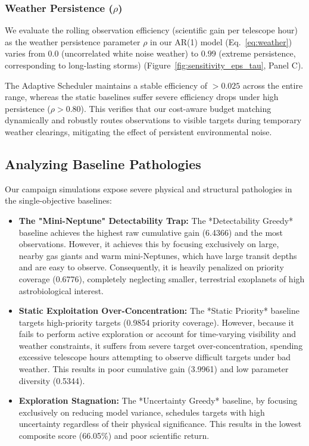 \documentclass[11pt,a4paper]{article}
\begin{document}
\subsubsection{Weather Persistence ($\rho$)}
We evaluate the rolling observation efficiency (scientific gain per telescope hour) as the weather persistence parameter $\rho$ in our AR(1) model (Eq.~\ref{eq:weather}) varies from $0.0$ (uncorrelated white noise weather) to $0.99$ (extreme persistence, corresponding to long-lasting storms) (Figure~\ref{fig:sensitivity_eps_tau}, Panel C). 

The Adaptive Scheduler maintains a stable efficiency of $> 0.025$ across the entire range, whereas the static baselines suffer severe efficiency drops under high persistence ($\rho > 0.80$). This verifies that our cost-aware budget matching dynamically and robustly routes observations to visible targets during temporary weather clearings, mitigating the effect of persistent environmental noise.

\subsection{Analyzing Baseline Pathologies}

Our campaign simulations expose severe physical and structural pathologies in the single-objective baselines:
\begin{itemize}
    \item \textbf{The "Mini-Neptune" Detectability Trap:} The *Detectability Greedy* baseline achieves the highest raw cumulative gain (6.4366) and the most observations. However, it achieves this by focusing exclusively on large, nearby gas giants and warm mini-Neptunes, which have large transit depths and are easy to observe. Consequently, it is heavily penalized on priority coverage (0.6776), completely neglecting smaller, terrestrial exoplanets of high astrobiological interest.
    \item \textbf{Static Exploitation Over-Concentration:} The *Static Priority* baseline targets high-priority targets (0.9854 priority coverage). However, because it fails to perform active exploration or account for time-varying visibility and weather constraints, it suffers from severe target over-concentration, spending excessive telescope hours attempting to observe difficult targets under bad weather. This results in poor cumulative gain (3.9961) and low parameter diversity (0.5344).
    \item \textbf{Exploration Stagnation:} The *Uncertainty Greedy* baseline, by focusing exclusively on reducing model variance, schedules targets with high uncertainty regardless of their physical significance. This results in the lowest composite score (66.05\%) and poor scientific return.
\end{itemize}
\end{document}
